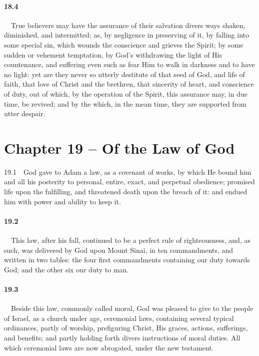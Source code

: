 \paragraph{18.4}\ \ True believers may have the assurance of their salvation divers ways shaken, diminished, and intermitted; as, by negligence in preserving of it, by falling into some special sin, which wounds the conscience and grieves the Spirit; by some sudden or vehement temptation, by God's withdrawing the light of His countenance, and suffering even such as fear Him to walk in darkness and to have no light: yet are they never so utterly destitute of that seed of God, and life of faith, that love of Christ and the brethren, that sincerity of heart, and conscience of duty, out of which, by the operation of the Spirit, this assurance may, in due time, be revived; and by the which, in the mean time, they are supported from utter despair.  

\section{Chapter 19 -- Of the Law of God} 19.1\ \ God gave to Adam a law, as a covenant of works, by which He bound him and all his posterity to personal, entire, exact, and perpetual obedience; promised life upon the fulfilling, and threatened death upon the breach of it: and endued him with power and ability to keep it.   
\bigskip
\paragraph{19.2}\ \ This law, after his fall, continued to be a perfect rule of righteousness, and, as such, was delivered by God upon Mount Sinai, in ten commandments, and written in two tables: the four first commandments containing our duty towards God; and the other six our duty to man.   
\bigskip
\paragraph{19.3}\ \ Beside this law, commonly called moral, God was pleased to give to the people of Israel, as a church under age, ceremonial laws, containing several typical ordinances, partly of worship, prefiguring Christ, His graces, actions, sufferings, and benefits; and partly holding forth divers instructions of moral duties. All which ceremonial laws are now abrogated, under the new testament.   
\bigskip
